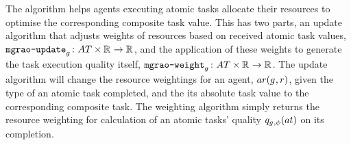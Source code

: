 The \acronymMGRAO{}{} algorithm helps agents executing atomic tasks allocate their resources to optimise the corresponding composite task value. This has two parts, an update algorithm that adjusts weights of resources based on received atomic task values, $\label{eq:mgrao_update}\formalMGRAOUpdate{}{}$,  and the application of these weights to generate the task execution quality itself, $\label{eq:mgrao_weighting}\formalMGRAOWeighting{}{}$. The update algorithm will change the resource weightings for an agent, $\functionAgentResources{}{}$, given the type of an atomic task completed, and the its absolute task value to the corresponding composite task. The weighting algorithm simply returns the resource weighting for calculation of an atomic tasks' quality $\functionAtomicTaskQualitySignature{}{}$ on its completion.

